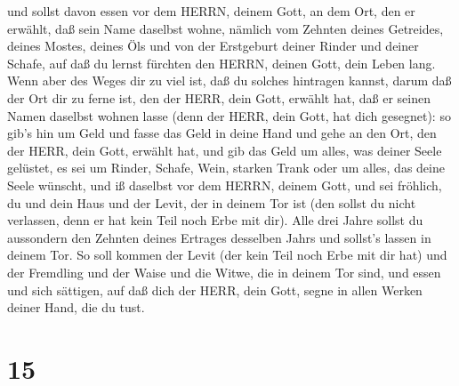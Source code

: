  und sollst davon essen vor dem HERRN, deinem Gott, an dem
Ort, den er erwählt, daß sein Name daselbst wohne, nämlich vom Zehnten
deines Getreides, deines Mostes, deines Öls und von der Erstgeburt
deiner Rinder und deiner Schafe, auf daß du lernst fürchten den HERRN,
deinen Gott, dein Leben lang.  Wenn aber des Weges dir zu
viel ist, daß du solches hintragen kannst, darum daß der Ort dir zu
ferne ist, den der HERR, dein Gott, erwählt hat, daß er seinen Namen
daselbst wohnen lasse (denn der HERR, dein Gott, hat dich gesegnet):
 so gib's hin um Geld und fasse das Geld in deine Hand und
gehe an den Ort, den der HERR, dein Gott, erwählt hat,  und
gib das Geld um alles, was deiner Seele gelüstet, es sei um Rinder,
Schafe, Wein, starken Trank oder um alles, das deine Seele wünscht, und
iß daselbst vor dem HERRN, deinem Gott, und sei fröhlich, du und dein
Haus  und der Levit, der in deinem Tor ist (den sollst du
nicht verlassen, denn er hat kein Teil noch Erbe mit dir). 
Alle drei Jahre sollst du aussondern den Zehnten deines Ertrages
desselben Jahrs und sollst's lassen in deinem Tor.  So soll
kommen der Levit (der kein Teil noch Erbe mit dir hat) und der Fremdling
und der Waise und die Witwe, die in deinem Tor sind, und essen und sich
sättigen, auf daß dich der HERR, dein Gott, segne in allen Werken deiner
Hand, die du tust.

\hypertarget{section-14}{%
\section{15}\label{section-14}}

